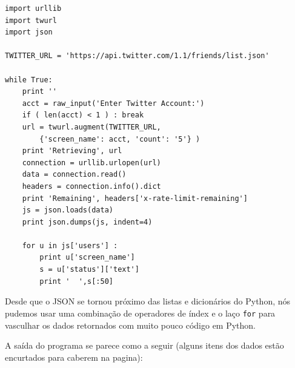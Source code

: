 \beforeverb
\begin{verbatim}
import urllib
import twurl
import json

TWITTER_URL = 'https://api.twitter.com/1.1/friends/list.json'

while True:
    print ''
    acct = raw_input('Enter Twitter Account:')
    if ( len(acct) < 1 ) : break
    url = twurl.augment(TWITTER_URL,
        {'screen_name': acct, 'count': '5'} )
    print 'Retrieving', url
    connection = urllib.urlopen(url)
    data = connection.read()
    headers = connection.info().dict
    print 'Remaining', headers['x-rate-limit-remaining']
    js = json.loads(data)
    print json.dumps(js, indent=4)

    for u in js['users'] :
        print u['screen_name']
        s = u['status']['text']
        print '  ',s[:50]
\end{verbatim}
\afterverb
%
Desde que o JSON se tornou próximo das listas e dicionários do Python,
nós pudemos usar uma combinação de operadores de índex e o laço
{\tt for} para vasculhar os dados retornados com muito pouco 
código em Python.

A saída do programa se parece como a seguir (alguns itens dos dados
estão encurtados para caberem na pagina):

